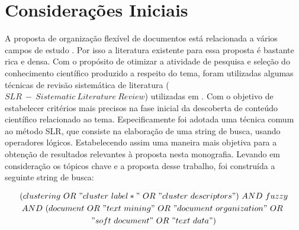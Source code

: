 %


\section{Considerações Iniciais}

A proposta de organização flexível de documentos está relacionada a vários campos de estudo
. Por isso a literatura existente para essa proposta é
bastante rica e densa. Com o propósito de otimizar a atividade de pesquisa e seleção do
conhecimento científico produzido a respeito do tema, foram utilizadas algumas técnicas de revisão
sistemática de literatura ($SLR\ -\ Sistematic\ Literature\ Review$) utilizadas em .
Com o objetivo de estabelecer critérios mais precisos na fase inicial da descoberta de conteúdo
científico relacionado ao tema. Especificamente foi adotada uma técnica comum ao método SLR, que consiste na
elaboração de uma string de busca, usando operadores lógicos. Estabelecendo assim uma maneira
mais objetiva para a obtenção de resultados relevantes à proposta nesta monografia. 
Levando em consideração os tópicos chave e a proposta desse trabalho, foi construída a seguinte
string de busca: 

\begin{multline} (clustering\ OR\ "cluster\ label*"\ OR\ "cluster\ descriptors")\ AND\ fuzzy \\ AND\
  (document\ OR\ "text\ mining"\ OR\ "document\ organization"\ OR\ \\ "soft\ document"\ OR\ "text\
data") \label{eq:busca} \end{multline}

